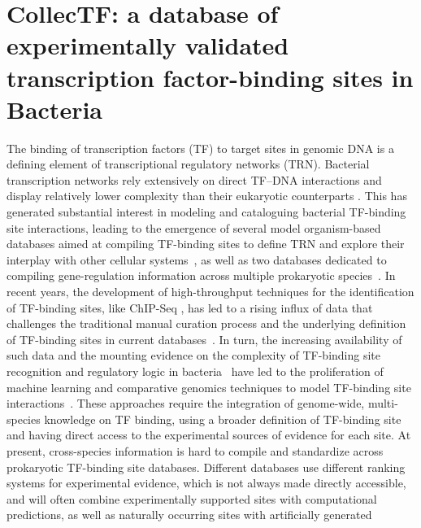 
\chapter{CollecTF: a database of experimentally validated transcription
  factor-binding sites in Bacteria}

The binding of transcription factors (TF) to target sites in genomic DNA is a
defining element of transcriptional regulatory networks (TRN). Bacterial
transcription networks rely extensively on direct TF–DNA interactions and
display relatively lower complexity than their eukaryotic counterparts
\cite{wunderlich2009different, remenyi2004combinatorial}. This has generated
substantial interest in modeling and cataloguing bacterial TF-binding site
interactions, leading to the emergence of several model organism-based
databases aimed at compiling TF-binding sites to define TRN and explore their
interplay with other cellular systems~\cite{salgado2013regulondb,
  jacques2005mtbreglist, pauling2012coryneregnet, sierro2008dbtbs}, as well as
two databases dedicated to compiling gene-regulation information across
multiple prokaryotic species~\cite{munch2005virtual,
  kazakov2007regtransbase}. In recent years, the development of high-throughput
techniques for the identification of TF-binding sites, like ChIP-Seq
\cite{mardis2007chip}, has led to a rising influx of data that challenges the
traditional manual curation process and the underlying definition of TF-binding
sites in current databases~\cite{salgado2013regulondb}. In turn, the increasing
availability of such data and the mounting evidence on the complexity of
TF-binding site recognition and regulatory logic in
bacteria~\cite{hijum2009mechanisms, paul2007integration, barnard2004regulation}
have led to the proliferation of machine learning and comparative genomics
techniques to model TF-binding site interactions~\cite{narlikar2013mumod,
  maienschein2012improved, zwir2005dissecting}. These approaches require the
integration of genome-wide, multi-species knowledge on TF binding, using a
broader definition of TF-binding site and having direct access to the
experimental sources of evidence for each site. At present, cross-species
information is hard to compile and standardize across prokaryotic TF-binding
site databases. Different databases use different ranking systems for
experimental evidence, which is not always made directly accessible, and will
often combine experimentally supported sites with computational predictions, as
well as naturally occurring sites with artificially generated
